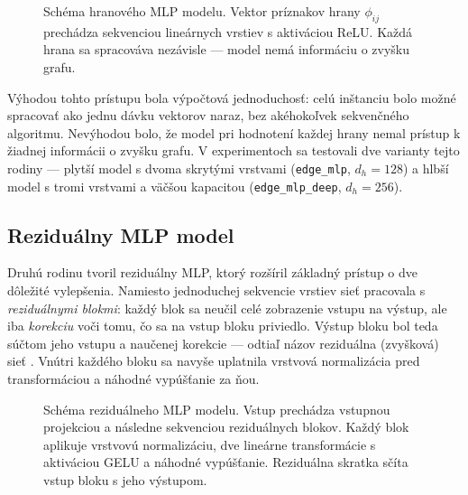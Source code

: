 \begin{figure}[H]
    \centering
    \resizebox{0.72\textwidth}{!}{}
    \caption{Schéma hranového MLP modelu. Vektor príznakov hrany
             \(\phi_{ij}\) prechádza sekvenciou lineárnych vrstiev
             s aktiváciou ReLU. Každá hrana sa spracováva nezávisle
             — model nemá informáciu o zvyšku grafu.}
    \label{fig:mlp_edge_diagram}
\end{figure}

\indent Výhodou tohto prístupu bola výpočtová jednoduchosť: celú
inštanciu bolo možné spracovať ako jednu dávku vektorov naraz, bez
akéhokoľvek sekvenčného algoritmu. Nevýhodou bolo, že model pri
hodnotení každej hrany nemal prístup k žiadnej informácii o zvyšku
grafu. V experimentoch sa testovali dve varianty tejto rodiny —
plytší model s dvoma skrytými vrstvami (\texttt{edge\_mlp},
\(d_h = 128\)) a hlbší model s tromi vrstvami a väčšou kapacitou
(\texttt{edge\_mlp\_deep}, \(d_h = 256\)).

\subsection{Reziduálny MLP model}
\label{sec:edge_res_mlp}

\indent Druhú rodinu tvoril reziduálny MLP, ktorý rozšíril základný
prístup o dve dôležité vylepšenia. Namiesto jednoduchej sekvencie vrstiev
sieť pracovala s \emph{reziduálnymi blokmi}: každý blok sa neučil celé
zobrazenie vstupu na výstup, ale iba \emph{korekciu} voči tomu, čo
sa na vstup bloku priviedlo. Výstup bloku bol teda súčtom jeho vstupu
a naučenej korekcie — odtiaľ názov reziduálna (zvyšková) sieť
\parencite{he2016resnet}. Vnútri každého bloku sa navyše uplatnila
vrstvová normalizácia pred transformáciou a náhodné vypúšťanie za ňou.

\begin{figure}[H]
    \centering
    \resizebox{0.80\textwidth}{!}{}
    \caption{Schéma reziduálneho MLP modelu. Vstup prechádza vstupnou
             projekciou a následne sekvenciou reziduálnych blokov.
             Každý blok aplikuje vrstvovú normalizáciu, dve lineárne
             transformácie s aktiváciou GELU a náhodné vypúšťanie.
             Reziduálna skratka sčíta vstup bloku s jeho výstupom.}
    \label{fig:res_mlp_diagram}
\end{figure}

